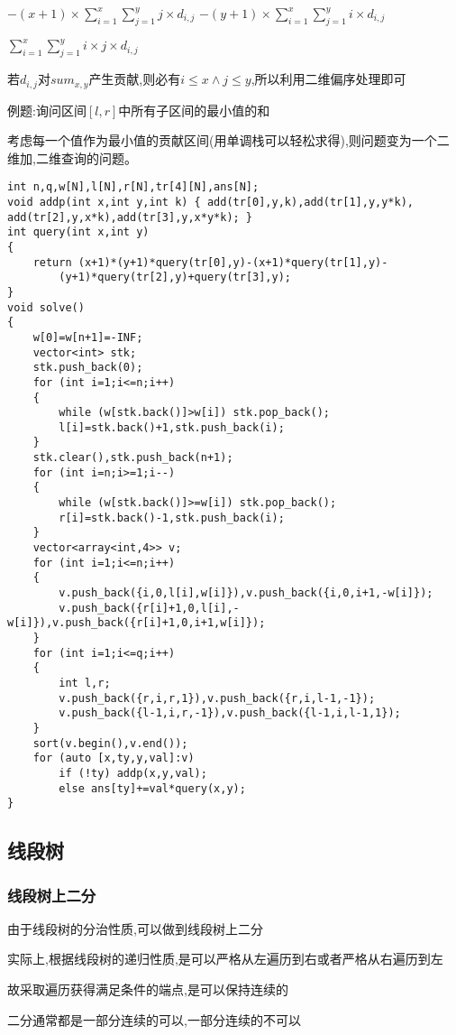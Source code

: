 \documentclass[a4paper]{ctexart}
\begin{document}
$-(x+1)\times \sum_{i=1}^x\sum_{j=1}^y j\times d_{i,j}$
$-(y+1)\times \sum_{i=1}^x\sum_{j=1}^y i\times d_{i,j}$

$\sum_{i=1}^x\sum_{j=1}^y i\times j\times d_{i,j}$

若$d_{i,j}$对$sum_{x,y}$产生贡献,则必有$i\le x\wedge j\le y$,所以利用二维偏序处理即可

例题:询问区间$[l,r]$中所有子区间的最小值的和

考虑每一个值作为最小值的贡献区间(用单调栈可以轻松求得),则问题变为一个二维加,二维查询的问题。

\begin{lstlisting}
int n,q,w[N],l[N],r[N],tr[4][N],ans[N];
void addp(int x,int y,int k) { add(tr[0],y,k),add(tr[1],y,y*k),
add(tr[2],y,x*k),add(tr[3],y,x*y*k); }
int query(int x,int y)
{
    return (x+1)*(y+1)*query(tr[0],y)-(x+1)*query(tr[1],y)-
        (y+1)*query(tr[2],y)+query(tr[3],y);
}
void solve()
{
    w[0]=w[n+1]=-INF;
    vector<int> stk;
    stk.push_back(0);
    for (int i=1;i<=n;i++)
    {
        while (w[stk.back()]>w[i]) stk.pop_back();
        l[i]=stk.back()+1,stk.push_back(i);
    }
    stk.clear(),stk.push_back(n+1);
    for (int i=n;i>=1;i--)
    {
        while (w[stk.back()]>=w[i]) stk.pop_back();
        r[i]=stk.back()-1,stk.push_back(i);
    }
    vector<array<int,4>> v;
    for (int i=1;i<=n;i++)
    {
        v.push_back({i,0,l[i],w[i]}),v.push_back({i,0,i+1,-w[i]});
        v.push_back({r[i]+1,0,l[i],-w[i]}),v.push_back({r[i]+1,0,i+1,w[i]});
    }
    for (int i=1;i<=q;i++)
    {
        int l,r;
        v.push_back({r,i,r,1}),v.push_back({r,i,l-1,-1});
        v.push_back({l-1,i,r,-1}),v.push_back({l-1,i,l-1,1});
    }
    sort(v.begin(),v.end());
    for (auto [x,ty,y,val]:v)
        if (!ty) addp(x,y,val);
        else ans[ty]+=val*query(x,y);
}
\end{lstlisting}

\subsection{线段树}
\subsubsection{线段树上二分}
由于线段树的分治性质,可以做到线段树上二分

实际上,根据线段树的递归性质,是可以严格从左遍历到右或者严格从右遍历到左

故采取遍历获得满足条件的端点,是可以保持连续的

二分通常都是一部分连续的可以,一部分连续的不可以 
\end{document}
